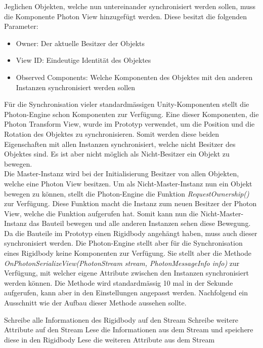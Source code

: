 Jeglichen Objekten, welche nun untereinander synchronisiert werden sollen, muss die Komponente Photon View hinzugefügt werden. Diese besitzt die folgenden Parameter:
\begin{itemize} [itemsep=1pt]
	\item Owner: Der aktuelle Besitzer der Objekts
	\item View ID: Eindeutige Identität des Objektes
	\item Observed Components: Welche Komponenten des Objektes mit den anderen Instanzen synchronisiert werden sollen
\end{itemize}

Für die Synchronisation vieler standardmässigen Unity-Komponenten stellt die Photon-Engine schon Komponenten zur Verfügung. Eine dieser Komponenten, die Photon Transform View, wurde im Prototyp verwendet, um die Position und die Rotation des Objektes zu synchronisieren. Somit werden diese beiden Eigenschaften mit allen Instanzen synchronisiert, welche nicht Besitzer des Objektes sind. Es ist aber nicht möglich als Nicht-Besitzer ein Objekt zu bewegen. \\
Die Master-Instanz wird bei der Initialisierung Besitzer von allen Objekten, welche eine Photon View besitzen. Um als Nicht-Master-Instanz nun ein Objekt bewegen zu können, stellt die Photon-Engine die Funktion \textit{RequestOwnership()} zur Verfügung. Diese Funktion macht die Instanz zum neuen Besitzer der Photon View, welche die Funktion aufgerufen hat. Somit kann nun die Nicht-Master-Instanz das Bauteil bewegen und alle anderen Instanzen sehen diese Bewegung. \\

\noindent Da die Bauteile im Prototyp einen Rigidbody angehängt haben, muss auch dieser synchronisiert werden. Die Photon-Engine stellt aber für die Synchronisation eines Rigidbody keine Komponenten zur Verfügung. Sie stellt aber die Methode \textit{OnPhotonSerializeView(PhotonStream stream, PhotonMessageInfo info)} zur Verfügung, mit welcher eigene Attribute zwischen den Instanzen synchronisiert werden können. Die Methode wird standardmässig 10 mal in der Sekunde aufgerufen, kann aber in den Einstellungen angepasst werden. Nachfolgend ein Ausschnitt wie der Aufbau dieser Methode aussehen sollte.

\begin{algorithm}
	 {
		Schreibe alle Informationen des Rigidbody auf den Stream\;
		Schreibe weitere Attribute auf den Stream\;
	}{
		Lese die Informationen aus dem Stream und speichere diese in den Rigidbody\;
		Lese die weiteren Attribute aus dem Stream\;	
	}
\end{algorithm}

